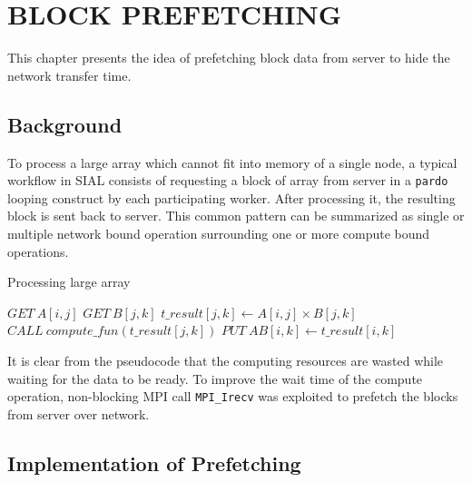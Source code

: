 \chapter{BLOCK PREFETCHING}\label{block prefetching}

This chapter presents the idea of prefetching block data from server to hide the
network transfer time.

\section{Background}
To process a large array which cannot fit into memory of a single node, a typical
workflow in SIAL consists of requesting a block of array from server in a
\texttt{pardo} looping construct by each participating worker. After processing
it, the resulting block is sent back to server. This common pattern can be
summarized as single or multiple network bound operation surrounding one or more
compute bound operations.

\begin{algorithm}  {Processing large array}
\singlespacing

\begin{algorithmic}[1]
\Loop{}
\State $GET\ A[i, j]$
\State $GET\ B[j, k]$
\State $t\_result[j, k] \gets A[i, j] \times B[j, k]$
\State $CALL\ compute\_fun(t\_result[j, k])$
\State $PUT\ AB[i, k] \gets t\_result[i, k]$
\EndLoop
\end{algorithmic}
\end{algorithm}

It is clear from the pseudocode that the computing resources are wasted while
waiting for the data to be ready. To improve the wait time of the compute
operation, non-blocking MPI call \texttt{MPI\_Irecv} was exploited to prefetch
the blocks from server over network.

\section{Implementation of Prefetching}

